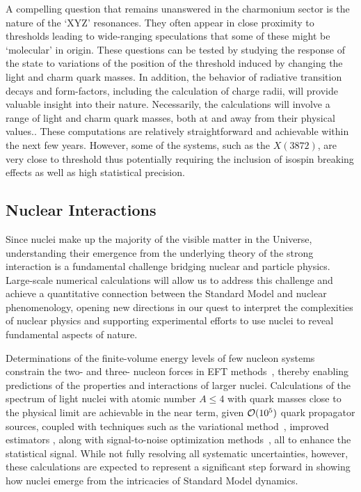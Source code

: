 A compelling question that remains unanswered in the charmonium sector is the nature of the `XYZ' resonances. They often appear in close proximity to thresholds leading to wide-ranging speculations that some of these might be `molecular' in origin. These questions can be tested by studying the response of the state to variations of the position of the threshold induced by changing the light and charm quark masses. In addition, the behavior of radiative transition decays and form-factors, including the calculation of charge radii, will provide valuable insight into their nature. Necessarily, the calculations will involve a range of light and charm quark masses, both at and away from their physical values..  These computations are relatively straightforward and achievable within the next few years. However, some of the systems, such as the $X(3872)$, are very close to threshold thus potentially requiring the inclusion of isospin breaking effects as well as high statistical precision.


\subsection{Nuclear Interactions}

Since nuclei make up the majority of the visible matter in the Universe, understanding their emergence from the underlying theory of the strong interaction is a fundamental challenge bridging nuclear and particle physics. Large-scale numerical calculations will allow us to address this challenge and achieve a quantitative connection between the Standard Model and nuclear phenomenology, opening new directions in our quest to interpret the complexities of nuclear physics and supporting experimental efforts to use nuclei to reveal fundamental aspects of nature.

Determinations of the finite-volume energy levels of few nucleon systems constrain the two- and three- nucleon forces in EFT methods~\cite{Barnea:2013uqa}, thereby enabling predictions of the properties and interactions of larger nuclei. Calculations of the spectrum of light nuclei with atomic number $A\le 4$ with quark masses close to the physical limit are achievable in the near term, given ${\cal O}(10^5)$ quark propagator sources, coupled with techniques such as the variational method~\cite{Michael:1985ne}, improved estimators \cite{Beane:2014oea}, along with signal-to-noise optimization methods~\cite{Detmold:2014hla}, all to enhance the statistical signal. While not fully resolving all systematic uncertainties, however, these calculations are expected to represent a significant step forward in showing how nuclei emerge from the intricacies of Standard Model dynamics.

